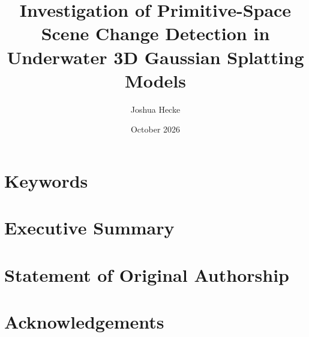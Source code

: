 \documentclass[final]{qutthesis}
\title{Investigation of Primitive-Space Scene Change Detection in Underwater 3D Gaussian Splatting Models}
\author{Joshua Hecke}
\date{October 2026}
\begin{document}
\frontmatter 
\pagestyle{myfancy}

\maketitle

\chapter{Keywords}
\normalfont

\clearpage

\chapter{Executive Summary}
\normalfont

\clearpage

\tableofcontents
\clearpage
\begingroup
\let\clearpage\relax
\listoftables
\vspace{2em}
\listoffigures
\endgroup
\clearpage

\chapter{Statement of Original Authorship}

\clearpage

\chapter{Acknowledgements}

\clearpage

\printglossary[type=\acronymtype,title=Abbreviations and Acronyms]
\clearpage

\mainmatter
\pagestyle{myfancy}








\appendix


\backmatter
\pagestyle{myfancy}



\end{document}
